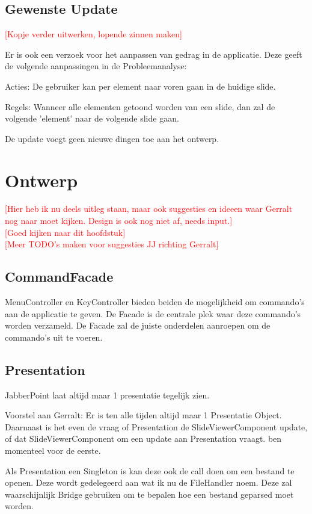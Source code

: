 \documentclass[a4paper]{article}
\newcommand{\todo}[1]{\textcolor{red}{[#1]}}
\begin{document}
\subsection{Gewenste Update}
\todo{Kopje verder uitwerken, lopende zinnen maken}

Er is ook een verzoek voor het aanpassen van gedrag in de applicatie. Deze geeft
de volgende aanpassingen in de Probleemanalyse:

Acties: De gebruiker kan per element naar voren gaan in de huidige slide.

Regels: Wanneer alle elementen getoond worden van een slide, dan zal de volgende
'element' naar de volgende slide gaan.

De update voegt geen nieuwe dingen toe aan het ontwerp.

\section{Ontwerp}
\todo{Hier heb ik nu deels uitleg staan, maar ook suggesties en ideeen waar
Gerralt nog naar moet kijken. Design is ook nog niet af, needs input.}
\\
\todo{Goed kijken naar dit hoofdstuk}
\\
\todo{Meer TODO's maken voor suggesties JJ richting Gerralt}

\subsection{CommandFacade}
MenuController en KeyController bieden beiden de mogelijkheid om commando's aan
de applicatie te geven. De Facade is de centrale plek waar deze commando's
worden verzameld. De Facade zal de juiste onderdelen aanroepen om de commando's
uit te voeren.

\subsection{Presentation}
JabberPoint laat altijd maar 1 presentatie tegelijk zien.

Voorstel aan Gerralt: Er is ten alle tijden altijd maar 1 Presentatie Object.
Daarnaast is het even de vraag of Presentation de SlideViewerComponent update,
of dat SlideViewerComponent om een update aan Presentation vraagt. ben momenteel
voor de eerste.

Als Presentation een Singleton is kan deze ook de call doen om een bestand te
openen. Deze wordt gedelegeerd aan wat ik nu de FileHandler noem. Deze zal
waarschijnlijk Bridge gebruiken om te bepalen hoe een bestand geparsed moet
worden.
\end{document}
